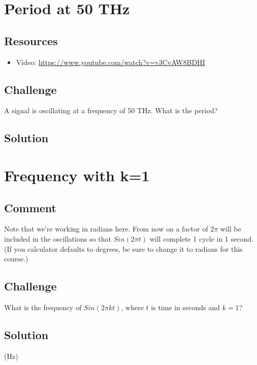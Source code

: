 \section{Period at 50 THz}

\subsection*{Resources}
\begin{itemize}
    \item Video: \url{https://www.youtube.com/watch?v=v3CvAW8BDHI}
\end{itemize}

\subsection*{Challenge}
A signal is oscillating at a frequency of 50 THz.  What is the period?

\subsection*{Solution}




\newpage

\section{Frequency with k=1}

\subsection*{Comment}
Note that we're working in radians here. From now on a factor of $2 \pi$ will be included in the oscillations so that $Sin(2 \pi t)$ will complete 1 cycle in 1 second.  (If you calculator defaults to degrees, be sure to change it to radians for this course.)

\subsection*{Challenge}
What is the frequency of $Sin(2 \pi k t)$, where $t$ is time in seconds and $k=1$?

\subsection*{Solution}
(Hz)

